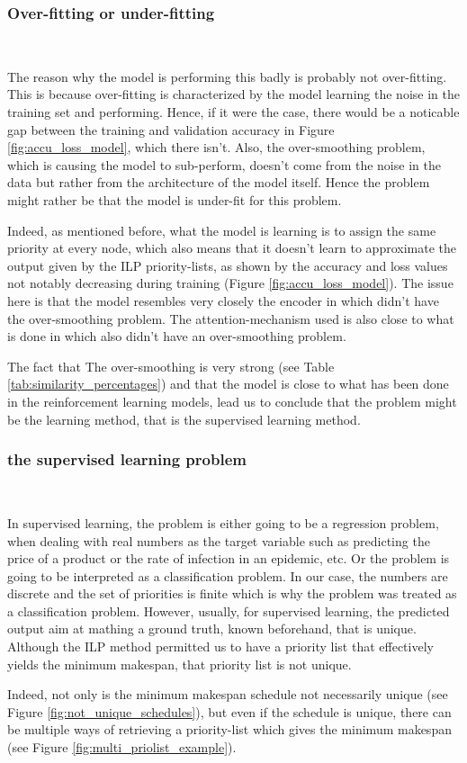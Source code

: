 \subsubsection{Over-fitting or under-fitting}
~

The reason why the model is performing this badly is probably
not over-fitting.
This is because over-fitting is characterized
by the model learning the noise in the training set and performing\cite{jabbar2015overfitting_underfitting}.
Hence, if it were the case, there would be a noticable gap
between the training and validation accuracy in Figure \ref{fig:accu_loss_model},
which there isn't.
Also, the over-smoothing problem, which is causing the model to sub-perform,
 doesn't come from the noise
in the data but rather from the architecture of the model itself\cite{chen2020oversmoothing}.
Hence the problem might rather be that the model is under-fit for this problem.

Indeed, as mentioned before, what the model is learning is 
to assign the same priority at every node, which also means
that it doesn't learn to approximate the output given by the ILP priority-lists,
as shown by the accuracy and loss values not notably decreasing during
training (Figure \ref{fig:accu_loss_model}).
The issue here is that the model resembles very closely the 
encoder in \citet{Lee2021GlobalDagSchedDRL} which didn't 
have the over-smoothing problem.
The attention-mechanism used is also close to what is done in \citet{Zhao2024GATDRLmodel}
which also didn't have an over-smoothing problem.

The fact that The over-smoothing is very strong (see Table \ref{tab:similarity_percentages})
and that the model is close to what has been done in the reinforcement learning models\cite{Lee2021GlobalDagSchedDRL}\cite{Zhao2024GATDRLmodel},
lead us to conclude that the problem might be the learning method, 
that is the supervised learning method.

\subsubsection{the supervised learning problem}
~

In supervised learning, the problem is either going to be a
regression problem, when dealing with real numbers as the target variable
such as predicting the price of a product or the rate of infection in an epidemic, etc.
Or the problem is going to be interpreted as a classification problem.
In our case, the numbers are discrete and the set of priorities is finite
which is why the problem was treated as a classification problem.
However, usually, for supervised learning, the predicted output 
aim at mathing a ground truth, known beforehand, that is unique.
Although the ILP method permitted us to have a priority list that
effectively yields the minimum makespan,
that priority list is not unique.

Indeed, not only is the minimum makespan schedule not necessarily unique
(see Figure \ref{fig:not_unique_schedules}),
but even if the schedule is unique, there can be multiple ways of 
retrieving a priority-list which gives the minimum makespan (see Figure \ref{fig:multi_priolist_example}).

